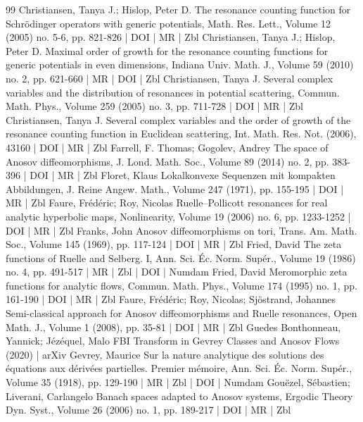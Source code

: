 \documentclass[10pt]{amsart}
\theoremstyle{definition}\newtheorem{defi}[theo]{Definition}\newtheorem{rema}[theo]{Remark}\newtheorem{exam}[theo]{Example}\newtheorem{exem}[theo]{Example}\newtheorem{nota}[theo]{Notation}
\begin{document}
\begin{thebibliography}{99}
 Christiansen, Tanya J.; Hislop, Peter D. The resonance counting function for Schrödinger operators with generic potentials, Math. Res. Lett., Volume 12 (2005) no. 5-6, pp. 821-826 | DOI | MR | Zbl
 Christiansen, Tanya J.; Hislop, Peter D. Maximal order of growth for the resonance counting functions for generic potentials in even dimensions, Indiana Univ. Math. J., Volume 59 (2010) no. 2, pp. 621-660 | MR | DOI | Zbl
 Christiansen, Tanya J. Several complex variables and the distribution of resonances in potential scattering, Commun. Math. Phys., Volume 259 (2005) no. 3, pp. 711-728 | DOI | MR | Zbl
 Christiansen, Tanya J. Several complex variables and the order of growth of the resonance counting function in Euclidean scattering, Int. Math. Res. Not. (2006), 43160 | DOI | MR | Zbl
 Farrell, F. Thomas; Gogolev, Andrey The space of Anosov diffeomorphisms, J. Lond. Math. Soc., Volume 89 (2014) no. 2, pp. 383-396 | DOI | MR | Zbl
 Floret, Klaus Lokalkonvexe Sequenzen mit kompakten Abbildungen, J. Reine Angew. Math., Volume 247 (1971), pp. 155-195 | DOI | MR | Zbl
 Faure, Frédéric; Roy, Nicolas Ruelle–Pollicott resonances for real analytic hyperbolic maps, Nonlinearity, Volume 19 (2006) no. 6, pp. 1233-1252 | DOI | MR | Zbl
 Franks, John Anosov diffeomorphisms on tori, Trans. Am. Math. Soc., Volume 145 (1969), pp. 117-124 | DOI | MR | Zbl
 Fried, David The zeta functions of Ruelle and Selberg. I, Ann. Sci. Éc. Norm. Supér., Volume 19 (1986) no. 4, pp. 491-517 | MR | Zbl | DOI | Numdam
 Fried, David Meromorphic zeta functions for analytic flows, Commun. Math. Phys., Volume 174 (1995) no. 1, pp. 161-190 | DOI | MR | Zbl
 Faure, Frédéric; Roy, Nicolas; Sjöstrand, Johannes Semi-classical approach for Anosov diffeomorphisms and Ruelle resonances, Open Math. J., Volume 1 (2008), pp. 35-81 | DOI | MR | Zbl
 Guedes Bonthonneau, Yannick; Jézéquel, Malo FBI Transform in Gevrey Classes and Anosov Flows (2020) | arXiv
 Gevrey, Maurice Sur la nature analytique des solutions des équations aux dérivées partielles. Premier mémoire, Ann. Sci. Éc. Norm. Supér., Volume 35 (1918), pp. 129-190 | MR | Zbl | DOI | Numdam
 Gouëzel, Sébastien; Liverani, Carlangelo Banach spaces adapted to Anosov systems, Ergodic Theory Dyn. Syst., Volume 26 (2006) no. 1, pp. 189-217 | DOI | MR | Zbl

\end{thebibliography}
\end{document}
